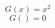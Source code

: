 \documentclass{article}
\begin{document}
\begin{equation} G(x) = x^2 \end{equation}
\begin{equation} G() = 0 \end{equation}
\end{document}
